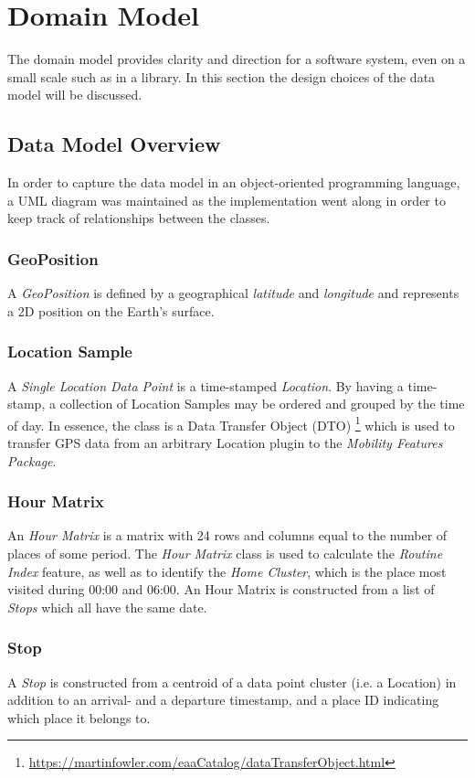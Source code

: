 \section{Domain Model}
The domain model provides clarity and direction for a software system, even on a small scale such as in a library. In this section the design choices of the data model will be discussed.

\subsection{Data Model Overview}
In order to capture the data model in an object-oriented programming language, a UML diagram was maintained as the implementation went along in order to keep track of relationships between the classes. 

\subsubsection*{GeoPosition}
A \textit{GeoPosition} is defined by a geographical \textit{latitude} and \textit{longitude} and represents a 2D position on the Earth's surface.

\subsubsection*{Location Sample}
A \textit{Single Location Data Point} is a time-stamped \textit{Location}. By having a time-stamp, a collection of Location Samples may be ordered and grouped by the time of day. In essence, the class is a Data Transfer Object (DTO) \footnote{\url{https://martinfowler.com/eaaCatalog/dataTransferObject.html}} which is used to transfer GPS data from an arbitrary Location plugin to the \textit{Mobility Features Package}.

\subsubsection*{Hour Matrix}
An \textit{Hour Matrix} is a matrix with 24 rows and columns equal to the number of places of some period. The \textit{Hour Matrix} class is used to calculate the \textit{Routine Index} feature, as well as to identify the \textit{Home Cluster}, which is the place most visited during 00:00 and 06:00. An Hour Matrix is constructed from a list of \textit{Stops} which all have the same date.

\subsubsection*{Stop}
A \textit{Stop} is constructed from a centroid of a data point cluster (i.e. a Location) in addition to an arrival- and a departure timestamp, and a place ID indicating which place it belongs to.

